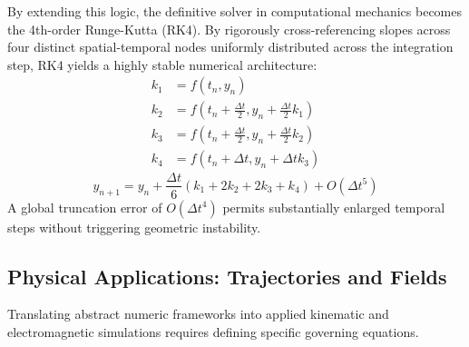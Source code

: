 \documentclass[aps, reprint, twocolumn, superscriptaddress, floatfix]{revtex4-2}
\begin{document}
By extending this logic, the definitive solver in computational mechanics becomes the 4th-order Runge-Kutta (RK4). By rigorously cross-referencing slopes across four distinct spatial-temporal nodes uniformly distributed across the integration step, RK4 yields a highly stable numerical architecture: 
\begin{equation}
\begin{aligned}
    k_1 &= f(t_n, y_n) \\
    k_2 &= f\left(t_n + \frac{\Delta t}{2}, y_n + \frac{\Delta t}{2} k_1\right) \\
    k_3 &= f\left(t_n + \frac{\Delta t}{2}, y_n + \frac{\Delta t}{2} k_2\right) \\
    k_4 &= f(t_n + \Delta t, y_n + \Delta t k_3) 
\end{aligned}
\end{equation}
\begin{equation}
    y_{n+1} = y_n + \frac{\Delta t}{6} (k_1 + 2k_2 + 2k_3 + k_4) + O(\Delta t^5)
\end{equation}
A global truncation error of $O(\Delta t^4)$ permits substantially enlarged temporal steps without triggering geometric instability.

\subsection{Physical Applications: Trajectories and Fields}
Translating abstract numeric frameworks into applied kinematic and electromagnetic simulations requires defining specific governing equations. 
\end{document}
